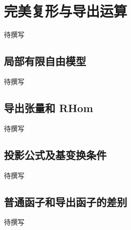 
% 
% 

\section{完美复形与导出运算}
\label{g5:sec:3102}

待撰写

\subsection{局部有限自由模型}
\label{g5:subsec:3102:01}
待撰写

\subsection{导出张量和 RHom}
\label{g5:subsec:3102:02}
待撰写

\subsection{投影公式及基变换条件}
\label{g5:subsec:3102:03}
待撰写

\subsection{普通函子和导出函子的差别}
\label{g5:subsec:3102:04}
待撰写
